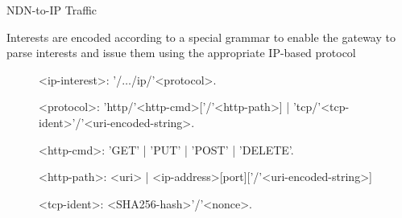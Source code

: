 \documentclass[handout]{beamer}
\begin{document}
\begin{frame}{NDN-to-IP Traffic}

Interests are encoded according to a special grammar to enable the gateway to parse interests and issue them using the appropriate IP-based protocol

\begin{figure}
\begin{mdframed}
\begingrammar

\noindent

<ip-interest>:	'/$\dots$/ip/'<protocol>.

<protocol>:	'http/'<http-cmd>[{'/'<http-path>}] | 'tcp/'<tcp-ident>'/'<uri-encoded-string>. 

<http-cmd>: 'GET' | 'PUT' | 'POST' | 'DELETE'.


<http-path>: <uri> | <ip-address>[port]['/'<uri-encoded-string>]

<tcp-ident>: <SHA256-hash>'/'<nonce>. %





		
\endgrammar
\end{mdframed}
\end{figure}

\end{frame}
\end{document}
